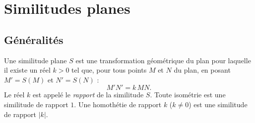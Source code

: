
\TCDLessonStyleOn
\providecommand{\Plan}{\mathscr{P}}
\providecommand{\Id}{\mathrm{Id}}
\providecommand{\Droite}{(\mathscr{D})}
\providecommand{\DroiteP}{(\mathscr{D}')}
\providecommand{\Arg}[1]{\mathrm{Arg}\left( #1 \right)}
\chapter{Similitudes planes}
      \section{G\'en\'eralit\'es}
            Une similitude plane $S$ est une transformation g\'eom\'etrique du plan pour laquelle il existe un r\'eel $k>0$ tel que,
            pour tous points $M$ et $N$ du plan, en posant $M' = S(M)$ et $N' = S(N)$ :
                  \[
                        M'N' = k\, MN.
                  \]
            Le r\'eel $k$ est appel\'e le \emph{rapport} de la similitude $S$.
            Toute isom\'etrie est une similitude de rapport $1$.
            Une homoth\'etie de rapport $k$ ($k \neq 0$) est une similitude de rapport $|k|$.
